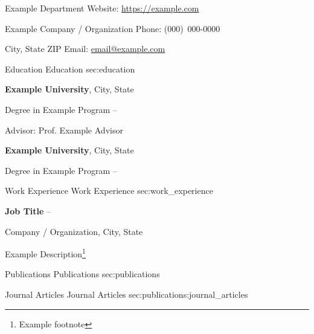 \documentclass[letterpaper,mmyyyy]{cvacademique}
\makeatletter
\newcommand{\CVAuthor}{A. N. Other}
\newcommand{\CVEmail}{email@example.com}
\newcommand{\CVWebpage}{https://example.com}
\newcommand{\CVPhone}{(000)~000-0000}
\newcommand{\CVAffiliation}{Example Department}
\newcommand{\CVInstitution}{Example Company / Organization}
\newcommand{\CVAddress}{City, State ZIP}
\makeatother
\begin{document}

\Title{\CVAuthor}

\begin{Subtitle}
\CVAffiliation
\hfill
Website: \href{\CVWebpage}{\url{\CVWebpage}}
\par
\CVInstitution
\hfill
Phone: \CVPhone
\par
\CVAddress
\hfill
Email: \href{mailto:\CVEmail}{\url{\CVEmail}}
\end{Subtitle}

\begin{Body}



\Section
{Education}
{Education}
{sec:education}

\textbf{Example University}, City, State

\AlignedItem
{Degree in Example Program}
{ -- }

Advisor: Prof. Example Advisor

\textbf{Example University}, City, State

\AlignedItem
{Degree in Example Program}
{ -- }



\Section
{Work Experience}
{Work Experience}
{sec:work_experience}

\AlignedItem
{\textbf{Job Title}}
{ -- \DatestampP}

Company / Organization, City, State

\BulletItem
{Example Description\footnote{Example footnote}}



\Section
{Publications}
{Publications}
{sec:publications}


\Subsection
{Journal Articles}
{Journal Articles}
{sec:publications:journal_articles}


\end{Body}
\end{document}
